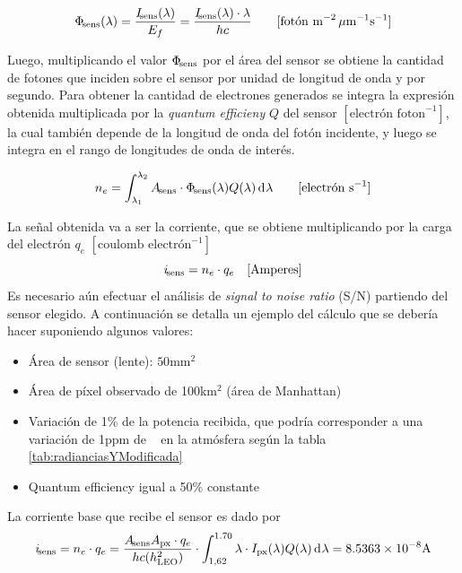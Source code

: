 \documentclass[titlepage,11pt]{article}
\begin{document}
\begin{equation}
    \Phi_{{\! \mathrm{\footnotesize sens}}}(\lambda) = \frac{I_{{\! \mathrm{\footnotesize sens}}}(\lambda)}{E_f} = \frac{I_{{\! \mathrm{\footnotesize sens}}}(\lambda) \cdot \lambda }{hc} \qquad [\text{fotón m}^{-2}\, \mu \text{m}^{-1} \text{s}^{-1}] 
\end{equation}

Luego, multiplicando el valor $\Phi_{{\! \mathrm{\footnotesize sens}}}$ por el área del sensor se obtiene la cantidad de fotones que inciden sobre el sensor por unidad de longitud de onda y por segundo. Para obtener la cantidad de electrones generados se integra la expresión obtenida multiplicada por la \textit{quantum efficieny} $Q$ del sensor $[\text{electrón foton}^{-1}]$, la cual también depende de la longitud de onda del fotón incidente, y luego se integra en el rango de longitudes de onda de interés.

\begin{equation}
    n_e = \int_{\lambda_1}^{\lambda_2} A_\sensor \cdot\Phi_\sensor(\lambda) Q(\lambda) \diff \lambda  \qquad [\text{electrón  s}^{-1}]
\end{equation}

La señal obtenida va a ser la corriente, que se obtiene multiplicando por la carga del electrón $q_e$ $[\text{coulomb electrón}^{-1}]$
\[
i_{{\! \mathrm{\footnotesize sens}}} = n_e\cdot q_e \quad [\text{Amperes}] 
\]
Es necesario aún efectuar el análisis de \textit{signal to noise ratio} (S/N) partiendo del sensor elegido. A continuación se detalla un ejemplo del cálculo que se debería hacer suponiendo algunos valores:

\begin{itemize}
    \item Área de sensor (lente): $50$mm$^2$
    \item Área de píxel observado de 100km$^2$ (área de Manhattan)
    \item Variación de 1\% de la potencia recibida, que podría corresponder a una variación de 1ppm de \metano~ en la atmósfera según la tabla \ref{tab:radianciasYModificada}

    \item Quantum efficiency igual a 50\% constante
\end{itemize}



La corriente base que recibe el sensor es dado por 
\[
i_\sensor = n_e \cdot q_e = \frac{A_\sensor A_\px \cdot q_e}{h c (h_\LEO^2) } \cdot \int_{1,62}^{1.70} \lambda \cdot \pixrad(\lambda) Q(\lambda) \diff \lambda = 8.5363\times 10^{-8} \text{A}
\]
\end{document}
